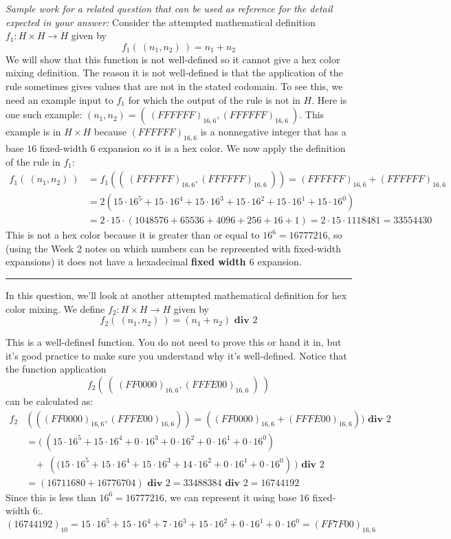 \documentclass[12pt, oneside]{article}
\begin{document}
\begin{enumerate}[labelindent=0pt, leftmargin=0pt]
\begin{enumerate}
{\it Sample work for a related question that can be used as reference for the detail expected 
in your answer:} Consider the attempted mathematical definition  $f_1: H\times H \to H$ given by
\[
f_1 (~(n_1, n_2) ~) = n_1 + n_2
\]
We will show that this function is not well-defined so it cannot give a hex color mixing definition. 
The reason it is not well-defined
is that the application of the rule sometimes gives values that are not in the stated codomain. 
To see this, we need an example input to $f_1$ for which the output of the rule is not in $H$.
Here is one such example: $(n_1, n_2) = (~(FFFFFF)_{16,6}, (FFFFFF)_{16,6}~)$. 
This example is in $H \times H$
because $(FFFFFF)_{16,6}$ is a nonnegative integer that has a base $16$ fixed-width $6$ expansion 
so it is a hex color.
We now apply the definition of the rule in $f_1$:
\begin{align*}
f_1 (~(n_1, n_2) ~) &=  f_1 ( (~(FFFFFF)_{16,6}, (FFFFFF)_{16,6}~) ) = (FFFFFF)_{16,6} + (FFFFFF)_{16,6} \\
&= 2 \left( 15\cdot 16^5 + 15\cdot 16^4 + 15 \cdot 16^3 + 15 \cdot 16^2 + 15 \cdot 16^1 + 15 \cdot 16^0 \right) \\
&= 2 \cdot 15 \cdot (1048576 + 65536 + 4096 + 256 + 16 + 1) = 2 \cdot 15 \cdot 1118481 = 33554430
\end{align*}
This is not a hex color because it is greater than or equal to $16^6 = 16777216$, 
so (using the Week 2 notes on which numbers can be represented
with fixed-width expansions) it does not have a hexadecimal {\bf fixed width $6$} expansion.

\rule{0.5\textwidth}{.4pt}

In this question, we'll look at another attempted mathematical definition for hex color mixing. 
We define $f_2: H\times H \to H$ given by
\[
f_2 (~(n_1, n_2) ~) = (n_1 + n_2) \textbf{ div } 2
\]

This is a well-defined function. You do not need to prove this or hand it in, but it's good practice to make 
sure you understand why it's well-defined. Notice that the function application 
\[
f_2 ( ~(~ (FF0000)_{16,6} , (FFFE00)_{16,6} ~)~)
\]
can be calculated as:
\begin{align*}
f_2&(((FF0000)_{16,6}, (FFFE00)_{16,6}))=
 ((FF0000)_{16,6} + (FFFE00)_{16,6})) \textbf{ div } 2\\
&= \big(~ \left(15\cdot16^5 + 15\cdot16^4 + 0\cdot16^3 + 0\cdot16^2 + 0\cdot16^1 + 0\cdot16^0 \right) \\
&~~~~+~
    \left((15\cdot16^5 + 15\cdot16^4 + 15\cdot16^3 + 14\cdot16^2 + 0\cdot16^1 + 0\cdot16^0\right )~\big )\textbf{ div } 2\\
&= (16711680 + 16776704) \textbf{ div } 2 = 33488384 \textbf{ div } 2 = 16744192
\end{align*}
Since this is less than $16^6 = 16777216$, we can represent it using base $16$ fixed-width $6$:.
$$(16744192)_{10} = 15\cdot16^5 + 15\cdot16^4 + 7\cdot16^3 + 15\cdot16^2 + 0\cdot16^1 + 0\cdot16^0 = (FF7F00)_{16,6}$$


\end{enumerate}
\end{enumerate}
\end{document}
